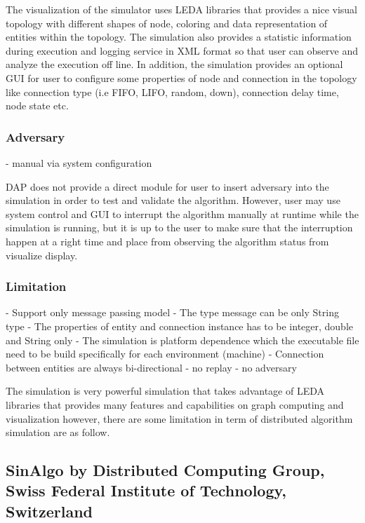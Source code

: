 The visualization of the simulator uses LEDA libraries that provides a nice visual topology with different shapes of node, coloring and data representation of entities within the topology. The simulation also provides a statistic information during execution and logging service in XML format so that user can observe and analyze the execution off line. In addition, the simulation provides an optional GUI for user to configure some properties of node and connection in the topology like connection type (i.e FIFO, LIFO, random, down), connection delay time, node state etc.

\subsubsection{Adversary}
- manual via system configuration

DAP does not provide a direct module for user to insert adversary into the simulation in order to test and validate the algorithm. However, user may use system control and GUI to interrupt the algorithm manually at runtime while the simulation is running, but it is up to the user to make sure that the interruption happen at a right time and place from observing the algorithm status from visualize display.


\subsubsection{Limitation}
- Support only message passing model
- The type message can be only String type
- The properties of entity and connection instance has to be integer, double and String only
- The simulation is platform dependence which the executable file need to be build specifically for each environment (machine)
- Connection between entities are always bi-directional
- no replay
- no adversary

The simulation is very powerful simulation that takes advantage of LEDA libraries that provides many features and capabilities on graph computing and visualization however, there are some limitation in term of distributed algorithm simulation are as follow.













\subsection{SinAlgo by Distributed Computing Group, Swiss Federal Institute of Technology, Switzerland}

